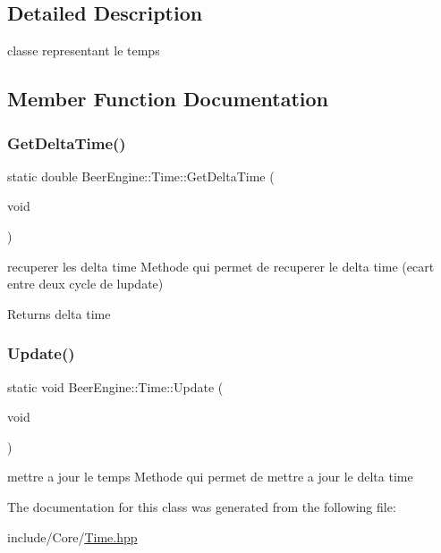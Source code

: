 \subsection{Detailed Description}
classe representant le temps 

\subsection{Member Function Documentation}
\mbox{\label{class_beer_engine_1_1_time_a0ade54bfb934ff9e3771912b3408e594}} 
\subsubsection{\texorpdfstring{Get\+Delta\+Time()}{GetDeltaTime()}}
{\footnotesize\ttfamily static double Beer\+Engine\+::\+Time\+::\+Get\+Delta\+Time (\begin{DoxyParamCaption}\item[{void}]{ }\end{DoxyParamCaption})\hspace{0.3cm}{\ttfamily [static]}}



recuperer les delta time Methode qui permet de recuperer le delta time (ecart entre deux cycle de l\textquotesingle{}update) 

\begin{DoxyReturn}{Returns}
delta time 
\end{DoxyReturn}
\mbox{\label{class_beer_engine_1_1_time_abc2653b297b763e819ac708600cccf95}} 
\subsubsection{\texorpdfstring{Update()}{Update()}}
{\footnotesize\ttfamily static void Beer\+Engine\+::\+Time\+::\+Update (\begin{DoxyParamCaption}\item[{void}]{ }\end{DoxyParamCaption})\hspace{0.3cm}{\ttfamily [static]}}



mettre a jour le temps Methode qui permet de mettre a jour le delta time 



The documentation for this class was generated from the following file\+:\begin{DoxyCompactItemize}
\item 
include/\+Core/\mbox{\hyperlink{_time_8hpp}{Time.\+hpp}}\end{DoxyCompactItemize}
